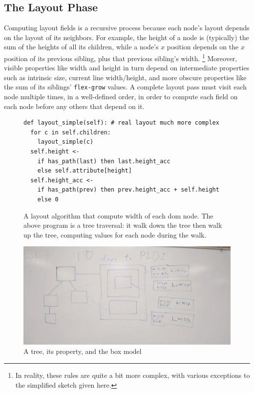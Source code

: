 \subsection{The Layout Phase}

Computing layout fields is a recursive process
  because each node's layout depends on the layout of its neighbors.
For example, the height of a node is (typically)
  the sum of the heights of all its children,
  while a node's $x$ position depends on the $x$ position
  of its previous sibling, plus that previous sibling's width.%
\footnote{
  In reality, these rules are quite a bit more complex,
    with various exceptions to the simplified sketch given here.}
Moreover, visible properties like width and height
  in turn depend on intermediate properties such as intrinsic size,
  current line width/height, and more obscure properties
  like the sum of its siblings' \texttt{flex-grow} values.
A complete layout pass must visit each node multiple times,
  in a well-defined order,
  in order to compute each field on each node
  before any others that depend on it.

\begin{figure}
\begin{verbatim}
def layout_simple(self): # real layout much more complex
  for c in self.children:
    layout_simple(c)
  self.height <-
    if has_path(last) then last.height_acc 
    else self.attribute[height]
  self.height_acc <-
    if has_path(prev) then prev.height_acc + self.height 
    else 0
\end{verbatim}
\caption{A layout algorithm that compute width of each dom node. The above program is a tree traversal: it walk down the tree then walk up the tree, computing values for each node during the walk.
}
\label{fig:layout-simple}
\end{figure}

\begin{figure}
\centering
\includegraphics[scale=0.15]{layout.jpg}
\caption{A tree, its property, and the box model}
\end{figure}


